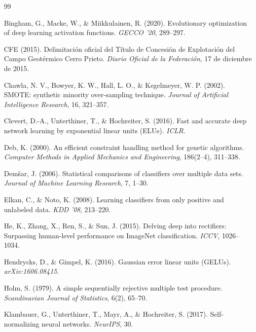 \documentclass[10pt,twocolumn,letterpaper]{article}
\begin{document}
\begin{thebibliography}{99}
\setlength{\itemsep}{0pt}
\setlength{\parskip}{0pt}
\scriptsize

Bingham, G., Macke, W., \& Miikkulainen, R. (2020). Evolutionary optimization of deep learning activation functions. \emph{GECCO '20}, 289--297.

CFE (2015). Delimitación oficial del Título de Concesión de Explotación del Campo Geotérmico Cerro Prieto. \emph{Diario Oficial de la Federación}, 17 de diciembre de 2015.

Chawla, N. V., Bowyer, K. W., Hall, L. O., \& Kegelmeyer, W. P. (2002). SMOTE: synthetic minority over-sampling technique. \emph{Journal of Artificial Intelligence Research}, 16, 321--357.

Clevert, D.-A., Unterthiner, T., \& Hochreiter, S. (2016). Fast and accurate deep network learning by exponential linear units (ELUs). \emph{ICLR}.

Deb, K. (2000). An efficient constraint handling method for genetic algorithms. \emph{Computer Methods in Applied Mechanics and Engineering}, 186(2--4), 311--338.

Dem\v{s}ar, J. (2006). Statistical comparisons of classifiers over multiple data sets. \emph{Journal of Machine Learning Research}, 7, 1--30.

Elkan, C., \& Noto, K. (2008). Learning classifiers from only positive and unlabeled data. \emph{KDD '08}, 213--220.

He, K., Zhang, X., Ren, S., \& Sun, J. (2015). Delving deep into rectifiers: Surpassing human-level performance on ImageNet classification. \emph{ICCV}, 1026--1034.

Hendrycks, D., \& Gimpel, K. (2016). Gaussian error linear units (GELUs). \emph{arXiv:1606.08415}.

Holm, S. (1979). A simple sequentially rejective multiple test procedure. \emph{Scandinavian Journal of Statistics}, 6(2), 65--70.

Klambauer, G., Unterthiner, T., Mayr, A., \& Hochreiter, S. (2017). Self-normalizing neural networks. \emph{NeurIPS}, 30.


\end{thebibliography}
\end{document}
